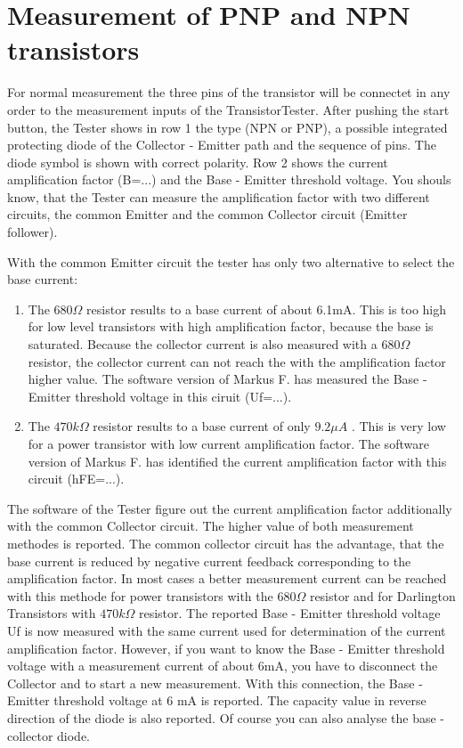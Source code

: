 \section{Measurement of PNP and NPN transistors}
For normal measurement the three pins of the transistor will be connectet in any order to the measurement
inputs of the TransistorTester.
After pushing the start button, the Tester shows in row 1 the type (NPN or PNP), 
a possible integrated protecting diode of the Collector - Emitter path and the
sequence of pins. The diode symbol is shown with correct polarity.
Row 2 shows the current amplification factor (B=...) and the Base - Emitter threshold voltage.
You shouls know, that the Tester can measure the amplification factor with two different circuits,
the common Emitter and the common Collector circuit (Emitter follower).


With the common Emitter circuit the tester has only two alternative to select the base current:
\begin{enumerate}
\item The \(680 \Omega\) resistor results to a base current of about 6.1mA. 
This is too high for low level transistors with high amplification factor, because the base is saturated.
Because the collector current is also measured with a \(680 \Omega\) resistor, the collector current
can not reach the with the amplification factor higher value.
The software version of Markus F. has measured the Base - Emitter threshold voltage in this ciruit (Uf=...).\\
\item The \(470 k\Omega\) resistor results to a base current of only \(9.2 \mu A\) .
This is very low for a power transistor with low current amplification factor.
The software version of Markus F. has identified the current amplification factor with this circuit (hFE=...).\\
\end{enumerate}

The software of the Tester figure out the current amplification factor additionally with the common Collector circuit.
The higher value of both measurement methodes is reported.
The common collector circuit has the advantage, that the base current is reduced by negative current feedback corresponding
to the amplification factor. 
In most cases a better measurement current can be reached with this methode for power transistors
with the \(680 \Omega\) resistor and for Darlington Transistors with \(470 k\Omega\) resistor.
The reported Base - Emitter threshold voltage Uf is now measured with the same current used 
for determination of the current amplification factor.
However, if you want to know the Base - Emitter threshold voltage with a measurement current of about 6mA,
you have to disconnect the Collector and to start a new measurement.
With this connection, the Base - Emitter threshold voltage at 6 mA is reported. The capacity value
in reverse direction of the diode is also reported.
Of course you can also analyse the base - collector diode.

